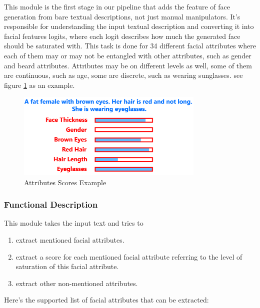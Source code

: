 This module is the first stage in our pipeline that adds the feature of face generation from bare textual descriptions, not just manual manipulators. It's responsible for understanding the input textual description and converting it into facial features logits, where each logit describes how much the generated face should be saturated with. This task is done for 34 different facial attributes where each of them may or may not be entangled with other attributes, such as gender and beard attributes. Attributes may be on different levels as well, some of them are continuous, such as age, some are discrete, such as wearing sunglasses. see figure \ref{fig:scores_example} as an example. 

\begin{figure}[H]
        \centering
        \includegraphics[width=0.8\textwidth]{images/scores-example.png}
        \caption{Attributes Scores Example}
        \label{fig:scores_example}
    \end{figure}


\subsubsection{Functional Description}
This module takes the input text and tries to 
\begin{enumerate}
    \item extract mentioned facial attributes.
    \item extract a score for each mentioned facial attribute referring to the level of saturation of this facial attribute.
    \item extract other non-mentioned attributes.
\end{enumerate}

Here’s the supported list of facial attributes that can be extracted:


